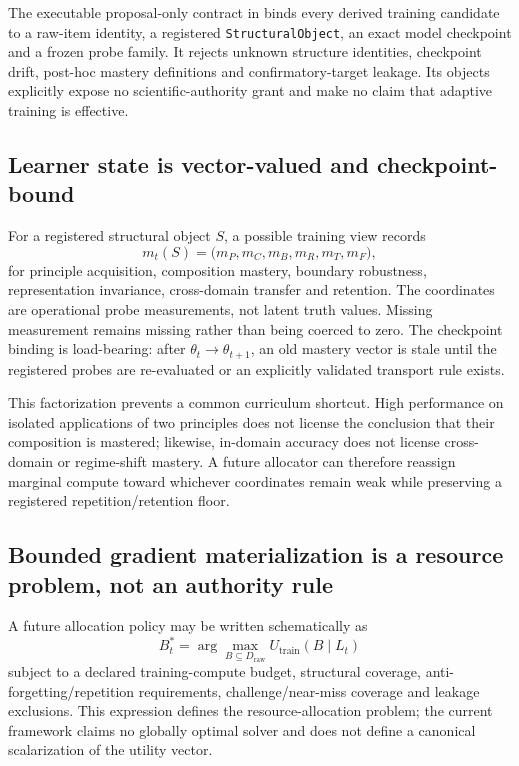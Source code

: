 \begin{sloppypar}
The executable proposal-only contract in  binds every derived training candidate to a raw-item identity, a registered \texttt{StructuralObject}, an exact model checkpoint and a frozen probe family.  It rejects unknown structure identities, checkpoint drift, post-hoc mastery definitions and confirmatory-target leakage.  Its objects explicitly expose no scientific-authority grant and make no claim that adaptive training is effective.
\end{sloppypar}

\subsection{Learner state is vector-valued and checkpoint-bound}

For a registered structural object $S$, a possible training view records
\[
m_t(S)=\bigl(m_P,m_C,m_B,m_R,m_T,m_F\bigr),
\]
for principle acquisition, composition mastery, boundary robustness, representation invariance, cross-domain transfer and retention.  The coordinates are operational probe measurements, not latent truth values.  Missing measurement remains missing rather than being coerced to zero.  The checkpoint binding is load-bearing: after $\theta_t\rightarrow\theta_{t+1}$, an old mastery vector is stale until the registered probes are re-evaluated or an explicitly validated transport rule exists.

This factorization prevents a common curriculum shortcut.  High performance on isolated applications of two principles does not license the conclusion that their composition is mastered; likewise, in-domain accuracy does not license cross-domain or regime-shift mastery.  A future allocator can therefore reassign marginal compute toward whichever coordinates remain weak while preserving a registered repetition/retention floor.

\subsection{Bounded gradient materialization is a resource problem, not an authority rule}

A future allocation policy may be written schematically as
\[
B_t^*=\arg\max_{B\subseteq D_{\mathrm{raw}}}
U_{\mathrm{train}}(B\mid L_t)
\]
subject to a declared training-compute budget, structural coverage, anti-forgetting/repetition requirements, challenge/near-miss coverage and leakage exclusions.  This expression defines the resource-allocation problem; the current framework claims no globally optimal solver and does not define a canonical scalarization of the utility vector.

